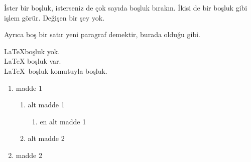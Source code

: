 \documentclass[preview,multi=page,margin=1mm]{standalone}
\begin{document}
\begin{page}
 İster bir boşluk, isterseniz de çok         sayıda boşluk bırakın. 
İkisi de bir boşluk gibi işlem görür. Değişen bir şey yok.

Ayrıca boş bir satır yeni paragraf demektir, burada olduğu gibi.
\end{page}
\begin{page}
\LaTeX  boşluk yok.\\
\LaTeX{} boşluk var.\\
\LaTeX\ boşluk komutuyla  boşluk.
\end{page}


\begin{page}
\begin{enumerate}
	\item madde 1
	\begin{enumerate}
		\item alt madde 1
		\begin{enumerate}
			\item en alt madde 1
		\end{enumerate}
		\item alt madde 2
	\end{enumerate}
	\item madde 2
\end{enumerate}
\end{page}
\end{document}
